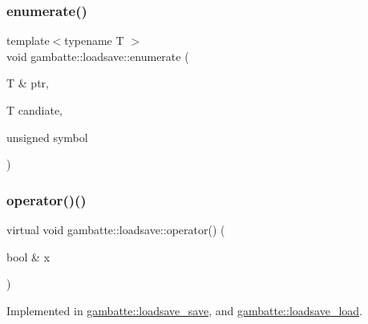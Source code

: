 \mbox{\label{classgambatte_1_1loadsave_afead9849579608ea420342ae0ec0feee}} 
\subsubsection{\texorpdfstring{enumerate()}{enumerate()}}
{\footnotesize\ttfamily template$<$typename T $>$ \\
void gambatte\+::loadsave\+::enumerate (\begin{DoxyParamCaption}\item[{T \&}]{ptr,  }\item[{T}]{candiate,  }\item[{unsigned}]{symbol }\end{DoxyParamCaption})\hspace{0.3cm}{\ttfamily [inline]}}

\mbox{\label{classgambatte_1_1loadsave_a286a1bc924db345dda227a735a5ba038}} 
\subsubsection{\texorpdfstring{operator()()}{operator()()}\hspace{0.1cm}{\footnotesize\ttfamily [1/19]}}
{\footnotesize\ttfamily virtual void gambatte\+::loadsave\+::operator() (\begin{DoxyParamCaption}\item[{bool \&}]{x }\end{DoxyParamCaption})\hspace{0.3cm}{\ttfamily [pure virtual]}}



Implemented in \hyperlink{classgambatte_1_1loadsave__save_a05b06e5e375fede9a5821fc2bbfd1cd9}{gambatte\+::loadsave\+\_\+save}, and \hyperlink{classgambatte_1_1loadsave__load_a551d7c208300ff066c9725c3efff8aa9}{gambatte\+::loadsave\+\_\+load}.

\mbox{\label{classgambatte_1_1loadsave_abe43ebb74162f066b542781f5ec7e5af}} 
